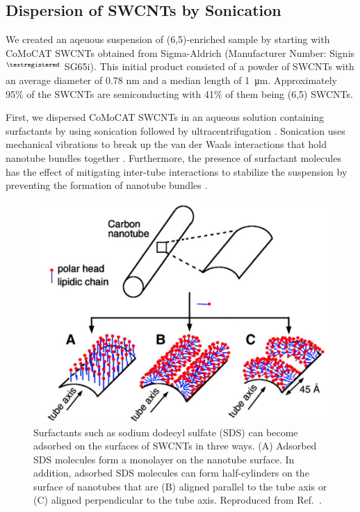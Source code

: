 \subsection{Dispersion of SWCNTs by Sonication}
\label{section:dispersion_swcnt}
We created an aqeuous suspension of (6,5)-enriched sample by starting with CoMoCAT SWCNTs obtained from Sigma-Aldrich (Manufacturer Number: Signis$^{\tiny{\textregistered}}$ SG65i). This initial product consisted of a powder of SWCNTs with an average diameter of 0.78 nm and a median length of \SI{1}{\micro \meter}. Approximately 95\% of the SWCNTs are semiconducting with 41\% of them being (6,5) SWCNTs.


First, we dispersed CoMoCAT SWCNTs in an aqueous solution containing surfactants by using sonication followed by ultracentrifugation \cite{liu1998fullerene, o2001reversible, o2002band}. Sonication uses mechanical vibrations to break up the van der Waals interactions that hold nanotube bundles together . Furthermore, the presence of surfactant molecules has the effect of mitigating inter-tube interactions to stabilize the suspension by preventing the formation of nanotube bundles \cite{liu1998fullerene, o2001reversible, o2002band}.

\begin{figure}[H]
\centering
\includegraphics[scale=0.3]{images/chapter_methods/surfactant_tkalya}
\caption{Surfactants such as sodium dodecyl sulfate (SDS) can become adsorbed on the surfaces of SWCNTs in three ways. (A) Adsorbed SDS molecules form a monolayer on the nanotube surface. In addition, adsorbed SDS molecules can form half-cylinders on the surface of nanotubes that are (B) aligned parallel to the tube axis or (C) aligned perpendicular to the tube axis. Reproduced from Ref.\ \cite{richard2003supramolecular}. }
\label{fig:sds_molecule}
\end{figure}

